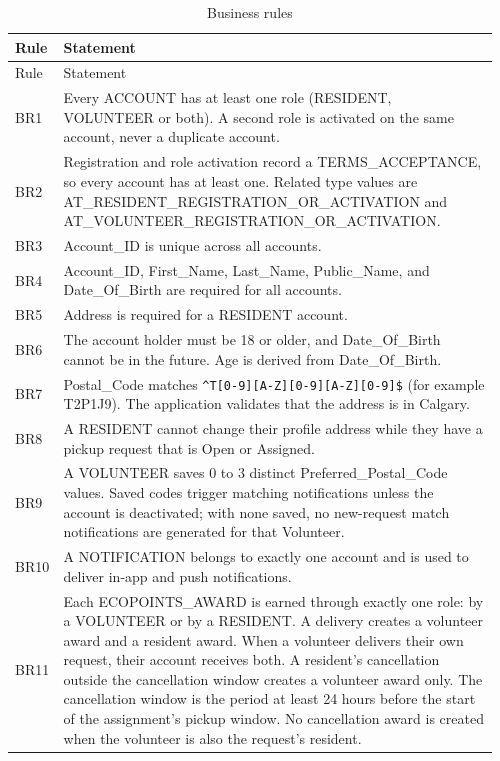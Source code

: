 \begin{longtable}{@{}p{0.07\linewidth}>{\raggedright\arraybackslash}p{0.89\linewidth}@{}}
\caption{Business rules}\label{tab:rules}\\
\toprule
Rule & Statement \\
\midrule
\endfirsthead
\toprule
Rule & Statement \\
\midrule
\endhead
\bottomrule
\endfoot
BR1 & Every ACCOUNT has at least one role (RESIDENT, VOLUNTEER or both). A second role is activated on the same account, never a duplicate account. \\
\addlinespace[2pt]
BR2 & Registration and role activation record a TERMS\_ACCEPTANCE, so every account has at least one. Related type values are AT\_RESIDENT\_REGISTRATION\_OR\_ACTIVATION and AT\_VOLUNTEER\_REGISTRATION\_OR\_ACTIVATION. \\
\addlinespace[2pt]
BR3 & Account\_ID is unique across all accounts. \\
\addlinespace[2pt]
BR4 & Account\_ID, First\_Name, Last\_Name, Public\_Name, and Date\_Of\_Birth are required for all accounts. \\
\addlinespace[2pt]
BR5 & Address is required for a RESIDENT account. \\
\addlinespace[2pt]
BR6 & The account holder must be 18 or older, and Date\_Of\_Birth cannot be in the future. Age is derived from Date\_Of\_Birth. \\
\addlinespace[2pt]
BR7 & Postal\_Code matches \texttt{\textasciicircum T[0-9][A-Z][0-9][A-Z][0-9]\$} (for example T2P1J9). The application validates that the address is in Calgary. \\
\addlinespace[2pt]
BR8 & A RESIDENT cannot change their profile address while they have a pickup request that is Open or Assigned. \\
\addlinespace[2pt]
BR9 & A VOLUNTEER saves 0 to 3 distinct Preferred\_Postal\_Code values. Saved codes trigger matching notifications unless the account is deactivated; with none saved, no new-request match notifications are generated for that Volunteer. \\
\addlinespace[2pt]
BR10 & A NOTIFICATION belongs to exactly one account and is used to deliver in-app and push notifications. \\
\addlinespace[2pt]
BR11 & Each ECOPOINTS\_AWARD is earned through exactly one role: by a VOLUNTEER or by a RESIDENT. A delivery creates a volunteer award and a resident award. When a volunteer delivers their own request, their account receives both. A resident's cancellation outside the cancellation window creates a volunteer award only. The cancellation window is the period at least 24 hours before the start of the assignment's pickup window. No cancellation award is created when the volunteer is also the request's resident. \\

\end{longtable}
